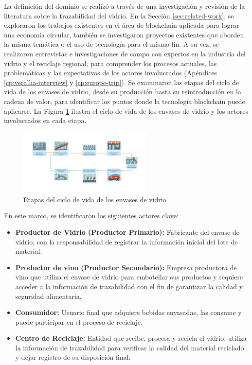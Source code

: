 La definición del dominio se realizó a través de una investigación y revisión de la literatura sobre la trazabilidad del vidrio. En la Sección \ref{sec:related-work}, se exploraron los trabajos existentes en el área de blockchain aplicada para lograr una economía circular, también se investigaron proyectos existentes que aborden la misma temática o el uso de tecnología para el mismo fin. A su vez, se realizaron entrevistas e investigaciones de campo con expertos en la industria del vidrio y el reciclaje regional, para comprender los procesos actuales, las problemáticas y las expectativas de los actores involucrados (Apéndices \ref{cp:verallia-interview} y \ref{cp:europe-trip}). Se examinaron las etapas del ciclo de vida de los envases de vidrio, desde su producción hasta su reintroducción en la cadena de valor, para identificar los puntos donde la tecnología blockchain puede aplicarse. La Figura \ref{fig:glass-lifecycle} ilustra el ciclo de vida de los envases de vidrio y los actores involucrados en cada etapa.

\begin{figure}[!htpb]
    \centering
    \includegraphics[width=0.6\textwidth]{Figures/glass-lifecycle.png}
    \caption{Etapas del ciclo de vida de los envases de vidrio}
    \label{fig:glass-lifecycle}
\end{figure}

En este marco, se identificaron los siguientes actores clave:

\begin{itemize}
    \item \textbf{Productor de Vidrio (Productor Primario):} Fabricante del envase de vidrio, con la responsabilidad de registrar la información inicial del lote de material.
    \item \textbf{Productor de vino (Productor Secundario):} Empresa productora de vino que utiliza el envase de vidrio para embotellar sus productos y requiere acceder a la información de trazabilidad con el fin de garantizar la calidad y seguridad alimentaria.
    \item \textbf{Consumidor:} Usuario final que adquiere bebidas envasadas, las consume y puede participar en el proceso de reciclaje.
    \item \textbf{Centro de Reciclaje:} Entidad que recibe, procesa y recicla el vidrio, utiliza la información de trazabilidad para verificar la calidad del material reciclado y dejar registro de su disposición final.
\end{itemize}

